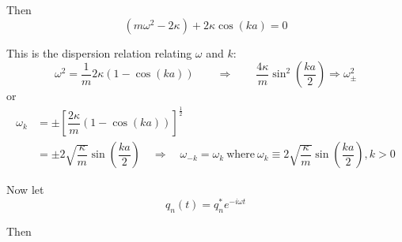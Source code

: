 \documentclass{article}
\begin{document}
\noindent Then
\begin{equation*}
    \left( m \omega^2 - 2 \kappa \right) + 2 \kappa \cos{(ka)} = 0
\end{equation*}

\noindent This is the dispersion relation relating $\omega$ and $k$:
\begin{equation*}
    \omega^2 = \dfrac{1}{m} 2 \kappa \left( 1 - \cos{(ka)} \right) \qquad \Longrightarrow \qquad \dfrac{ 4 \kappa }{m} \sin^2{\left(\dfrac{ k a }{2}\right)} \Rightarrow \omega_\pm^2
\end{equation*}
or
\begin{align*}
    \omega_k &= \pm {\left[ \dfrac{ 2 \kappa }{m} \left( 1 - \cos{(ka)} \right) \right]}^\frac{1}{2} \\
    &= \pm 2 \sqrt{\dfrac{\kappa}{m}} \sin{\left( \dfrac{ka}{2} \right)} \quad \Longrightarrow \quad \omega_{-k} = \omega_{k} ~ \mathrm{where} ~ \omega_k \equiv 2 \sqrt{\dfrac{\kappa}{m}} \sin{\left( \dfrac{ka}{2} \right)}, k>0
\end{align*}

\noindent Now let
\begin{equation*}
    q_n (t) = q_n^* e^{ -i \omega t }
\end{equation*}


\noindent Then
\end{document}

